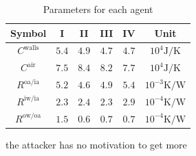 \documentclass[../main.tex]{subfiles}
\begin{document}
\begin{table}[b]
  \centering
  \caption{
    Parameters for each agent}\label{tab:modelParam}
  \begin{tabular}[t]{cccccc} \toprule
    Symbol& I & II & III & IV &Unit\\
    \midrule
    $C^{\text{walls}}$   &$5.4$&$4.9$&$4.7$&$4.7$ &$10^{4}\mathrm{J/K}$ \\
    $C^{\text{air}}$     &$7.5$ &$8.4 $&$8.2$ &$7.7$&$10^{4}\mathrm{J/K}$  \\
    $R^{\text{oa/ia}}$   &$5.2$&$4.6$&$4.9$&$5.4$&$10^{-3}\mathrm{K/W}$ \\
    $R^{\text{iw/ia}}$   &$2.3$&$2.4$&$2.3$&$2.9$&$10^{-4}\mathrm{K/W}$\\
    $R^{\text{ow/oa}}$   &$1.5$&$0.6$&$0.7$&$0.7$& $10^{-4}\mathrm{K/W}$ \\
    \bottomrule
  \end{tabular}
\end{table}

the attacker has no motivation to get more
\end{document}
